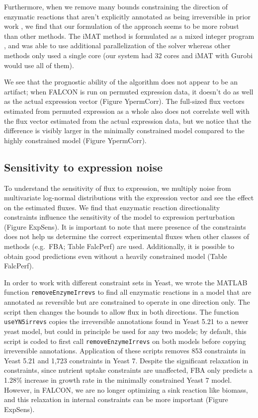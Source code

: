 Furthermore, when we remove many bounds
constraining the direction of enzymatic reactions that aren't
explicitly annotated as being irreversible in prior work
\citep{Lee2012}, we find that our formulation of the approach seems to
be more robust than other methods. The iMAT method is formulated as a mixed integer program
\citep{Shlomi2008}, and was able to use additional parallelization of
the solver \citep{gurobi} whereas other methods only 
used a single core (our system had 32 cores and
iMAT with Gurobi would use all of them). 

We see that the prognostic ability of the algorithm does not
appear to be an artifact; when FALCON is run on permuted expression data,
it doesn't do as well as the actual expression vector (Figure YpermCorr).
The full-sized flux vectors estimated from permuted expression as a
whole also does not correlate well with the flux vector estimated from
the actual expression data, but we notice that the difference is
visibly larger in the minimally constrained model compared to the
highly constrained model (Figure YpermCorr). 

\subsection{Sensitivity to expression noise}
To understand the sensitivity of flux to expression, we multiply noise
from multivariate log-normal distributions with the expression vector
and see the effect on the estimated fluxes. We find that enzymatic
reaction directionality constraints influence the sensitivity of the
model to expression perturbation (Figure ExpSens). It is important to
note that mere presence of the constraints does not help us determine
the correct experimental fluxes when other classes of methods (e.g.\
FBA; Table FalcPerf) are used. Additionally, it is possible to obtain
good predictions even without a heavily constrained model (Table
FalcPerf).

In order to work with different constraint sets in Yeast, we wrote the
MATLAB function \texttt{removeEnzymeIrrevs} to find all enzymatic
reactions in a model that are annotated as reversible but are
constrained to operate in one direction only. The script then changes
the bounds to allow flux in both directions. The function
\texttt{useYN5irrevs} copies the irreversible annotations found in
Yeast 5.21 \citep{Lee2012} to a newer yeast model, but could in
principle be used for any two models; by default, this script is coded
to first call \texttt{removeEnzymeIrrevs} on both models before
copying irreversible annotations. Application of these scripts removes
853 constraints in Yeast 5.21 and 1,723 constraints in Yeast
7. Despite the significant relaxation in constraints, since nutrient
uptake constraints are unaffected, FBA only predicts a 1.28\%
increase in growth rate in the minimally constrained Yeast 7
model. However, in FALCON, we are no longer optimizing a sink reaction
like biomass, and this relaxation in internal constraints can be more
important (Figure ExpSens).

